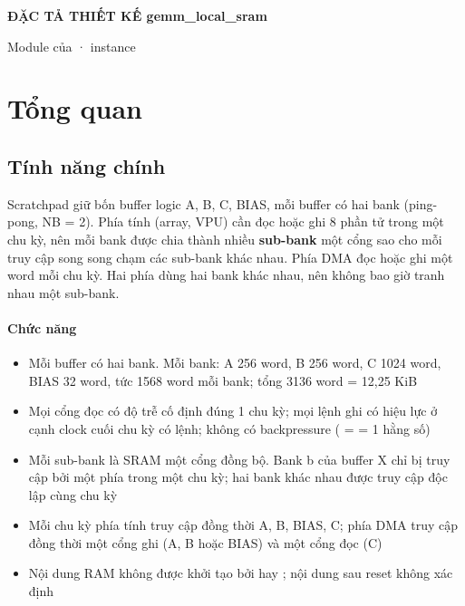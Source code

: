 \documentclass[10pt,a4paper]{article}
\begin{document}
{\Large\bfseries ĐẶC TẢ THIẾT KẾ gemm\_local\_sram}\par
\vspace{2pt}
{\small\color{muted}Module của  · instance }\par
\tableofcontents
\clearpage

\section{Tổng quan}
\subsection{Tính năng chính}\label{sec:1}

Scratchpad giữ bốn buffer logic A, B, C, BIAS, mỗi buffer có hai bank (ping-pong, NB = 2). Phía tính (array, VPU) cần đọc hoặc ghi 8 phần tử trong một chu kỳ, nên mỗi bank được chia thành nhiều \textbf{sub-bank} một cổng sao cho mỗi truy cập song song chạm các sub-bank khác nhau. Phía DMA đọc hoặc ghi một word mỗi chu kỳ. Hai phía dùng hai bank khác nhau, nên không bao giờ tranh nhau một sub-bank.

\paragraph{Chức năng}
\begin{itemize}
\item Mỗi buffer có hai bank. Mỗi bank: A 256 word, B 256 word, C 1024 word, BIAS 32 word, tức 1568 word mỗi bank; tổng 3136 word = 12,25 KiB
\item Mọi cổng đọc có độ trễ cố định đúng 1 chu kỳ; mọi lệnh ghi có hiệu lực ở cạnh clock cuối chu kỳ có lệnh; không có backpressure ( =  = 1 hằng số)
\item Mỗi sub-bank là SRAM một cổng đồng bộ. Bank b của buffer X chỉ bị truy cập bởi một phía trong một chu kỳ; hai bank khác nhau được truy cập độc lập cùng chu kỳ
\item Mỗi chu kỳ phía tính truy cập đồng thời A, B, BIAS, C; phía DMA truy cập đồng thời một cổng ghi (A, B hoặc BIAS) và một cổng đọc (C)
\item Nội dung RAM không được khởi tạo bởi  hay ; nội dung sau reset không xác định
\end{itemize}

\end{document}
